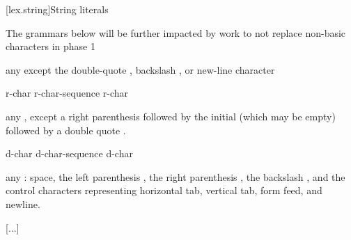 \documentclass{wg21}
\begin{document}
[lex.string]{String literals}


\begin{quoteblock}
The grammars below will be further impacted by work to not replace non-basic characters in phase 1
\end{quoteblock}

\begin{bnf}
\br
\textnormal{any  except the double-quote , backslash \terminal{\textbackslash}, or new-line character}
\end{bnf}

\begin{bnf}
    \br
      \terminal{(}  \terminal{)}  
\end{bnf}

\begin{bnf}
    \br
    r-char\br
    r-char-sequence r-char
\end{bnf}

\begin{bnf}
    \br
    \textnormal{any , except a right parenthesis \terminal{)} followed by}\br
    \bnfindent\textnormal{the initial  (which may be empty) followed by a double quote .}
\end{bnf}

\begin{bnf}
    \br
    d-char\br
    d-char-sequence d-char
\end{bnf}


\begin{bnf}
    \br
    \textnormal{any  :}\br
    \bnfindent\textnormal{space, the left parenthesis \terminal{(}, the right parenthesis \terminal{)}, the backslash \terminal{\textbackslash}, and the control characters}\br
    \bnfindent\textnormal{representing horizontal tab, vertical tab, form feed, and newline.}
\end{bnf}


[...]
\end{document}

